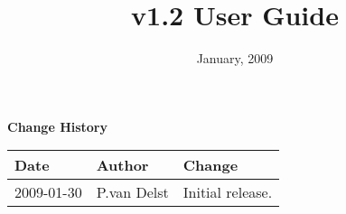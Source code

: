 



\newcommand{\Atmosphere}{\texttt{Atmosphere}}
\newcommand{\Cloud}{\texttt{Cloud}}
\newcommand{\Aerosol}{\texttt{Aerosol}}
\newcommand{\Surface}{\texttt{Surface}}
\newcommand{\GeometryInfo}{\texttt{GeometryInfo}}
\newcommand{\ChannelInfo}{\texttt{ChannelInfo}}
\newcommand{\Options}{\texttt{Options}}
\newcommand{\AtmOptics}{\texttt{AtmOptics}}
\newcommand{\SfcOptics}{\texttt{SfcOptics}}
\newcommand{\RTSolution}{\texttt{RTSolution}}
\newcommand{\SensorData}{\texttt{SensorData}}
\newcommand{\AtmAbsorption}{\texttt{AtmAbsorption}}
\newcommand{\AtmScatter}{\texttt{AtmScatter}}
\newcommand{\CloudScatter}{\texttt{CloudScatter}}
\newcommand{\AerosolScatter}{\texttt{AerosolScatter}}
\newcommand{\f}[1]{\texttt{#1}}
\newcommand{\tblhd}[1]{\sffamily\textbf{#1}}

\newcommand{\inarg}[1]{\f{\textcolor{green}{#1}}}
\newcommand{\outarg}[1]{\f{\textcolor{red}{#1}}}
\newcommand{\optarg}[1]{\f{\textit{#1}}}

\newcommand{\dstar}{\ensuremath{\delta^{*}\!}}
\newcommand{\radunit}{mW/(m\ensuremath{^2}.sr.\invcm)}

\title{v1.2 User Guide}
\date{January, 2009}



\maketitle

\draftwatermark

\thispagestyle{empty}
\vspace*{10cm}
\begin{center}
  {\sffamily\Large\bfseries Change History}
  \begin{table}[htp]
    \centering
    \begin{tabular}{|p{2cm}|p{3cm}|p{8cm}|}
      \hline
      \sffamily\textbf{Date} & \sffamily\textbf{Author} & \sffamily\textbf{Change}\\
      \hline\hline
      2009-01-30 & P.van Delst & Initial release.\\
      \hline
    \end{tabular}
  \end{table}
\end{center}
\clearpage
{}
\setcounter{page}{1}

